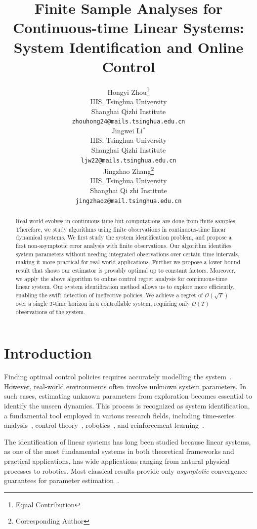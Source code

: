 \documentclass{article}
\title{Finite Sample Analyses for Continuous-time Linear Systems: System Identification and Online Control}
\author{%
  Hongyi Zhou\thanks{Equal Contribution} \\
  IIIS, Tsinghua University\\
  Shanghai Qizhi Institute \\
\texttt{zhouhong24@mails.tsinghua.edu.cn} \\
  \And
 Jingwei Li$^{*}$ \\
  IIIS, Tsinghua University\\
  Shanghai Qizhi Institute \\
\texttt{ljw22@mails.tsinghua.edu.cn} \\
  \And
  Jingzhao Zhang\thanks{Corresponding Author} \\
  IIIS, Tsinghua University \\
  Shanghai Qi zhi Institute \\
  \texttt{jingzhaoz@mail.tsinghua.edu.cn} \\
}
\theoremstyle{definition}
\begin{document}
\maketitle


\begin{abstract}
 Real world evolves in continuous time but computations are done from finite samples. Therefore, we study algorithms using finite observations in continuous-time linear dynamical systems. 
We first study the system identification problem, and propose a first non-asymptotic error analysis with finite observations. Our algorithm identifies system parameters without needing integrated observations over certain time intervals, making it more practical for real-world applications. Further we propose a lower bound result that shows our estimator is provably optimal up to constant factors.
Moreover, we apply the above algorithm to online control regret analysis for continuous-time linear system. Our system identification method allows us to explore more efficiently, enabling the swift detection of ineffective policies. We achieve a regret of $\mathcal{O}(\sqrt{T})$ over a single $T$-time horizon in a controllable system, requiring only $\mathcal{O}(T)$ observations of the system. 
\end{abstract}


\section{Introduction}
Finding optimal control policies requires accurately modelling the system~\citep{ref25}. However, real-world environments often involve unknown system parameters. In such cases,  estimating unknown parameters from exploration becomes essential to identify the unseen dynamics. This process is recognized as system identification, a fundamental tool employed in various research fields, including time-series analysis~\citep{ref12}, control theory~\citep{ref13}, robotics~\citep{ref14}, and reinforcement learning~\citep{ref15}. 

The identification of linear systems has long been studied because linear systems, as one of the most fundamental systems in both theoretical frameworks and practical applications,  has wide applications ranging from natural physical processes to robotics. Most classical results provide only \emph{asymptotic} convergence guarantees for parameter estimation~\citep{ref8, ref20, ref26}. 
\end{document}
